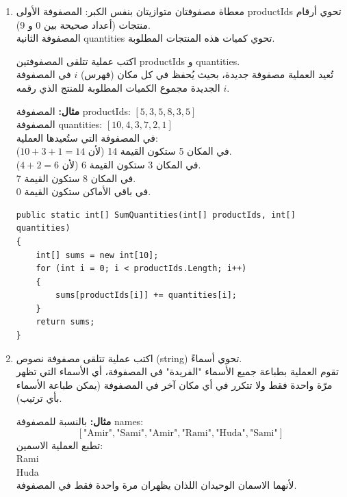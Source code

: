 \documentclass[14pt]{extarticle}
\begin{document}
\begin{enumerate}[itemsep=3em]
\item
معطاة مصفوفتان متوازيتان بنفس الكبر:
المصفوفة الأولى \textenglish{productIds} تحوي أرقام منتجات (أعداد صحيحة بين 0 و 9). \\
المصفوفة الثانية \textenglish{quantities} تحوي كميات هذه المنتجات المطلوبة.

اكتب عملية تتلقى المصفوفتين \textenglish{productIds} و \textenglish{quantities}. \\
تُعيد العملية مصفوفة جديدة، بحيث يُحفظ في كل مكان (فهرس) $i$ في المصفوفة الجديدة مجموع الكميات المطلوبة للمنتج الذي رقمه $i$.

\textbf{مثال:}
المصفوفة \textenglish{productIds}: $[5, 3, 5, 8, 3, 5]$ \\
المصفوفة \textenglish{quantities}: $[10, 4, 3, 7, 2, 1]$ \\
في المصفوفة التي ستُعيدها العملية: \\
في المكان 5 ستكون القيمة 14 (لأن $10 + 3 + 1 = 14$). \\
في المكان 3 ستكون القيمة 6 (لأن $4 + 2 = 6$). \\
في المكان 8 ستكون القيمة 7. \\
في باقي الأماكن ستكون القيمة 0.

\ifwithsols
\begin{boxSolution}
\begin{english}
\begin{verbatim}
public static int[] SumQuantities(int[] productIds, int[] quantities)
{
    int[] sums = new int[10];
    for (int i = 0; i < productIds.Length; i++)
    {
        sums[productIds[i]] += quantities[i];
    }
    return sums;
}
\end{verbatim}
\end{english}
\end{boxSolution}
\clearpage
\fi

\item
اكتب عملية تتلقى مصفوفة نصوص (\textenglish{string}) تحوي أسماءً. \\
تقوم العملية بطباعة جميع الأسماء "الفريدة" في المصفوفة، أي الأسماء التي تظهر مرّة واحدة فقط ولا تتكرر في أي مكان آخر في المصفوفة (يمكن طباعة الأسماء بأي ترتيب).

\textbf{مثال:}
بالنسبة للمصفوفة \textenglish{names}:
$$ [\text{"Amir"}, \text{"Sami"}, \text{"Amir"}, \text{"Rami"}, \text{"Huda"}, \text{"Sami"}] $$
تطبع العملية الاسمين: \\
\textenglish{Rami} \\
\textenglish{Huda} \\
لأنهما الاسمان الوحيدان اللذان يظهران مرة واحدة فقط في المصفوفة.


\end{enumerate}
\end{document}

